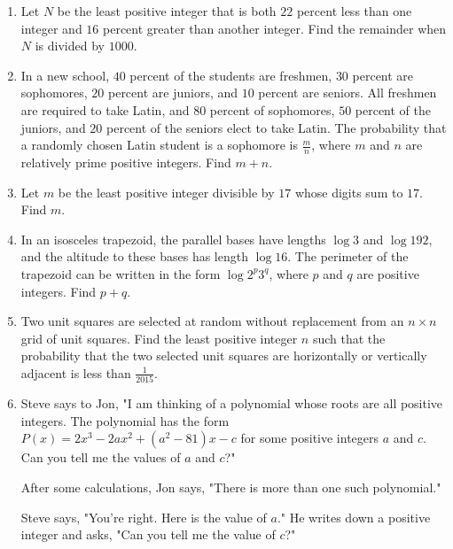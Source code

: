 \documentclass{article}
\begin{document}
\begin{enumerate}[label=\arabic*., itemsep=0.5em]
\item Let \(N\) be the least positive integer that is both \(22\) percent less than one integer and \(16\) percent greater than another integer. Find the remainder when \(N\) is divided by \(1000\).\par \vspace{0.5em}\item In a new school, \(40\) percent of the students are freshmen, \(30\) percent are sophomores, \(20\) percent are juniors, and \(10\) percent are seniors. All freshmen are required to take Latin, and \(80\) percent of sophomores, \(50\) percent of the juniors, and \(20\) percent of the seniors elect to take Latin. The probability that a randomly chosen Latin student is a sophomore is \(\frac{m}{n}\), where \(m\) and \(n\) are relatively prime positive integers. Find \(m+n\).\par \vspace{0.5em}\item Let \(m\) be the least positive integer divisible by \(17\) whose digits sum to \(17\). Find \(m\).\par \vspace{0.5em}\item In an isosceles trapezoid, the parallel bases have lengths \(\log 3\) and \(\log 192\), and the altitude to these bases has length \(\log 16\). The perimeter of the trapezoid can be written in the form \(\log 2^p 3^q\), where \(p\) and \(q\) are positive integers. Find \(p + q\).\par \vspace{0.5em}\item Two unit squares are selected at random without replacement from an \(n \times n\) grid of unit squares. Find the least positive integer \(n\) such that the probability that the two selected unit squares are horizontally or vertically adjacent is less than \(\frac{1}{2015}\).\par \vspace{0.5em}\item Steve says to Jon, "I am thinking of a polynomial whose roots are all positive integers. The polynomial has the form \(P(x) = 2x^3-2ax^2+(a^2-81)x-c\) for some positive integers \(a\) and \(c\). Can you tell me the values of \(a\) and \(c\)?"

After some calculations, Jon says, "There is more than one such polynomial."

Steve says, "You're right.  Here is the value of \(a\)." He writes down a positive integer and asks, "Can you tell me the value of \(c\)?"


\end{enumerate}
\end{document}
